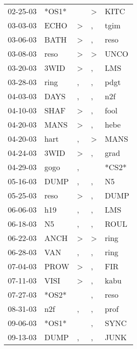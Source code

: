 \begin{supertabular}{lllll}
 02-25-03 &  *OS1* &                  &     \textgreater &   KITC \\
 03-03-03 &   ECHO &     \textgreater &                , &   tgim \\
 03-06-03 &   BATH &     \textgreater &                , &   reso \\
 03-08-03 &   reso &     \textgreater &     \textgreater &   UNCO \\
 03-20-03 &   3WID &     \textgreater &                , &    LMS \\
 03-28-03 &   ring &                , &                , &   pdgt \\
 04-03-03 &   DAYS &                , &                , &    n2f \\
 04-10-03 &   SHAF &     \textgreater &                , &   fool \\
 04-20-03 &   MANS &     \textgreater &                , &   hebe \\
 04-20-03 &   hart &                , &     \textgreater &   MANS \\
 04-24-03 &   3WID &     \textgreater &                , &   grad \\
 04-29-03 &   gogo &                , &                  &  *CS2* \\
 05-16-03 &   DUMP &                , &                , &     N5 \\
 05-25-03 &   reso &     \textgreater &                , &   DUMP \\
 06-06-03 &    h19 &                , &                , &    LMS \\
 06-18-03 &     N5 &                , &                , &   ROUL \\
 06-22-03 &   ANCH &     \textgreater &     \textgreater &   ring \\
 06-28-03 &    VAN &                , &                , &   ring \\
 07-04-03 &   PROW &     \textgreater &                , &    FIR \\
 07-11-03 &   VISI &     \textgreater &                , &   kabu \\
 07-27-03 &  *OS2* &                  &                , &   reso \\
 08-31-03 &    n2f &                , &                , &   prof \\
 09-06-03 &  *OS1* &                  &                , &   SYNC \\
 09-13-03 &   DUMP &                , &                , &   JUNK \\

\end{supertabular}
